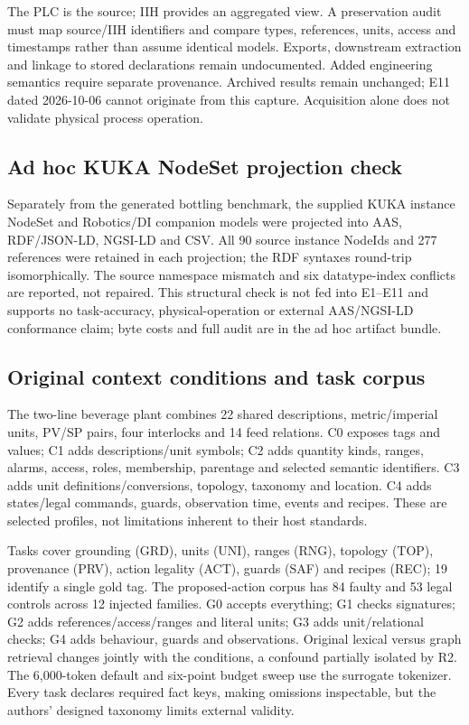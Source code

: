 \documentclass[10pt,journal,letterpaper]{IEEEtran}
\begin{document}
The PLC is the source; IIH provides an aggregated view. A preservation audit
must map source/IIH identifiers and compare types, references, units, access and
timestamps rather than assume identical models. Exports, downstream extraction
and linkage to stored declarations remain undocumented. Added engineering
semantics require separate provenance. Archived results remain unchanged;
E11 dated 2026-10-06 cannot originate from this capture. Acquisition alone does
not validate physical process operation.

\subsection{Ad hoc KUKA NodeSet projection check}
Separately from the generated bottling benchmark, the supplied KUKA instance
NodeSet and Robotics/DI companion models were projected into AAS, RDF/JSON-LD,
NGSI-LD and CSV. All 90 source instance NodeIds and 277 references were retained
in each projection; the RDF syntaxes round-trip isomorphically. The source
namespace mismatch and six datatype-index conflicts are reported, not repaired.
This structural check is not fed into E1--E11 and supports no task-accuracy,
physical-operation or external AAS/NGSI-LD conformance claim; byte costs and
full audit are in the ad hoc artifact bundle.

\subsection{Original context conditions and task corpus}
The two-line beverage plant combines 22 shared descriptions, metric/imperial
units, PV/SP pairs, four interlocks and 14 feed relations. C0 exposes tags and
values; C1 adds descriptions/unit symbols; C2 adds quantity kinds, ranges,
alarms, access, roles, membership, parentage and selected semantic identifiers.
C3 adds unit definitions/conversions, topology, taxonomy and location. C4 adds
states/legal commands, guards, observation time, events and recipes. These
are selected profiles, not limitations inherent to their host standards.

Tasks cover grounding (GRD), units (UNI), ranges (RNG), topology (TOP), provenance
(PRV), action legality (ACT), guards (SAF) and recipes (REC); 19 identify a single
gold tag. The proposed-action corpus has 84 faulty and 53 legal controls across
12 injected families. G0 accepts everything; G1 checks signatures; G2 adds
references/access/ranges and literal units; G3 adds unit/relational checks;
G4 adds behaviour, guards and observations. Original lexical versus graph
retrieval changes jointly with the conditions, a confound partially isolated
by R2. The 6,000-token default and six-point budget sweep use the surrogate
tokenizer. Every task declares required fact keys, making omissions inspectable,
but the authors' designed taxonomy limits external validity.
\end{document}
